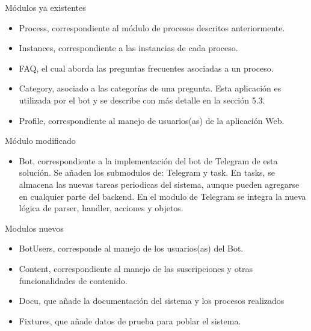    Módulos ya existentes
    \begin{itemize}
        \item Process, correspondiente al módulo de procesos descritos anteriormente.
        \item Instances, correspondiente a las instancias de cada proceso.
        \item FAQ, el cual aborda las preguntas frecuentes asociadas a un proceso.
        \item Category, asociado a las categorías de una pregunta. Esta aplicación es utilizada por el bot y se describe con más detalle en la sección 5.3.
        \item Profile, correspondiente al manejo de usuarios(as) de la aplicación Web.  
    \end{itemize}

    Módulo modificado
    \begin{itemize}
        \item Bot, correspondiente a la implementación del bot de Telegram de esta solución. Se añaden los submodulos de: Telegram y task. En tasks, se almacena las nuevas tareas periodicas del sistema, aunque pueden agregarse en cualquier parte del backend. En el modulo de Telegram se integra la nueva lógica de parser, handler, acciones y objetos.
    \end{itemize}
    
    Modulos nuevos
    \begin{itemize}
        \item BotUsers, corresponde al manejo de los usuarios(as) del Bot.
        \item Content, correspondiente al manejo de las suscripciones y otras funcionalidades de contenido.
        \item Docu, que añade la documentación del sistema y los procesos realizados
        \item Fixtures, que añade datos de prueba para poblar el sistema.
    \end{itemize}

